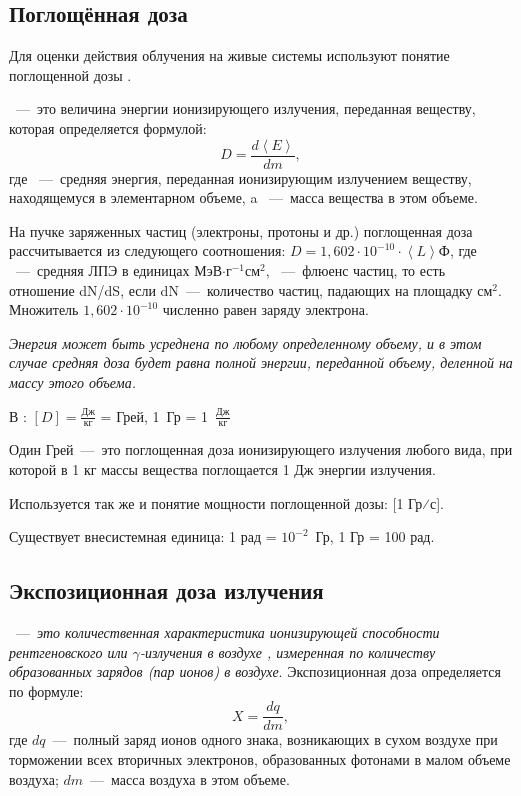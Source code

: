 \documentclass[a4paper, 14pt]{article}
\renewcommand{\emph}[1]{{\color{RedOrange}{\textit{\textbf{#1}}}}}
\begin{document}
\subsection{Поглощённая доза}
Для оценки действия облучения на живые системы используют понятие
поглощенной дозы \emph{D}.

\emph{D}~---~это величина энергии ионизирующего излучения, переданная веществу, которая определяется формулой:
\begin{equation}
    D = \frac{d\left\langle E \right\rangle }{dm},
\end{equation}
где \emph{d$\left\langle E \right\rangle$}~---~средняя энергия, переданная ионизирующим излучением веществу, находящемуся в элементарном объеме, a \emph{dm}~---~масса вещества в этом объеме.

На пучке заряженных частиц (электроны, протоны и др.) поглощенная доза
рассчитывается из следующего соотношения: $D = 1,602\cdot 10^{-10}\cdot \left\langle L \right\rangle\text{Ф}$, где \emph{L}~---~средняя ЛПЭ
в единицах МэВ$\cdot \text{г}^{-1}\text{см}^2$, \emph{Ф}~---~флюенс частиц, то есть отношение dN/dS, если dN~---~количество частиц, падающих на площадку \emph{dS} см$^2$. Множитель $1,602\cdot 10^{-10}$ численно равен заряду электрона.

\textit{Энергия может быть усреднена по любому определенному объему, и в этом
случае средняя доза будет равна полной энергии, переданной объему, деленной на
массу этого объема.}

В \emph{СИ}: $[D] = \frac{\text{Дж}}{\text{кг}}$ = Грей, 1~Гр = 1~$\frac{\text{Дж}}{\text{кг}}$

Один Грей~---~это поглощенная доза ионизирующего излучения любого вида, при
которой в 1 кг массы вещества поглощается 1 Дж энергии излучения.

Используется так же и понятие мощности поглощенной дозы: [1 Гр⁄с].

Существует внесистемная единица: 1 рад = $10^{-2}$~Гр, 1 Гр = 100 рад.

\subsection{Экспозиционная доза излучения}
\emph{Экспозиционная доза (X)}~---~\textit{это количественная характеристика ионизирующей
способности рентгеновского или $\gamma$-излучения в воздухе 
, измеренная по количеству образованных зарядов (пар
ионов) в воздухе}. Экспозиционная доза определяется по формуле:
\begin{equation}
    X = \frac{dq}{dm},
\end{equation}
где $dq$~---~полный заряд ионов одного знака,
возникающих в сухом воздухе при торможении всех вторичных электронов,
образованных фотонами в малом объеме воздуха; $dm$~---~масса воздуха в этом объеме.
\end{document}
